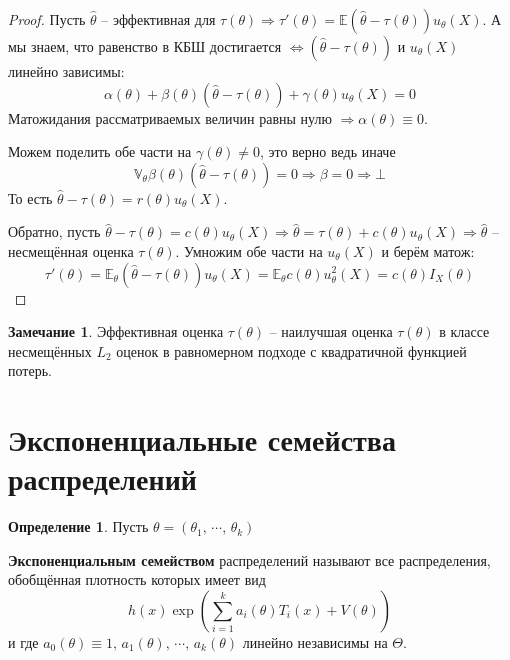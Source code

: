 \documentclass[a4paper,12pt]{article}
\theoremstyle{plain}
\theoremstyle{definition}
\newtheorem{definition}{Определение}[section]
\newtheorem*{note}{Замечание}
\theoremstyle{remark}
\begin{document}
\begin{proof}
  Пусть $\hat{\theta}$ -- эффективная для $\tau(\theta) \Rightarrow \tau'(\theta) = \mathbb{E}(\hat{\theta} - \tau(\theta))u_\theta(X)$. А мы знаем, что равенство в КБШ достигается $\Leftrightarrow (\hat{\theta} - \tau(\theta))$ и $u_\theta(X)$ линейно зависимы:
  \[
    \alpha(\theta) + \beta(\theta)(\hat{\theta} - \tau(\theta)) + \gamma(\theta)u_\theta(X) = 0
  \]
  Матожидания рассматриваемых величин равны нулю $\Rightarrow \alpha(\theta) \equiv 0$.

  Можем поделить обе части на $\gamma(\theta) \neq 0$, это верно ведь иначе
  \[
    \mathbb{V}_\theta\beta(\theta)(\hat{\theta} - \tau(\theta)) = 0 \Rightarrow \beta = 0 \Rightarrow\bot
  \]
  То есть $\hat{\theta} - \tau(\theta) = r(\theta)u_\theta(X)$.

  Обратно, пусть $\hat{\theta} - \tau(\theta) = c(\theta)u_\theta(X) \Rightarrow \hat{\theta} = \tau(\theta) + c(\theta)u_\theta(X) \Rightarrow \hat{\theta}$ -- несмещённая оценка $\tau(\theta)$. Умножим обе части на $u_\theta(X)$ и берём матож:
  \[
    \tau'(\theta) = \mathbb{E}_\theta(\hat{\theta} - \tau(\theta))u_\theta(X) = \mathbb{E}_\theta c(\theta)u^2_\theta(X) = c(\theta)I_X(\theta)
  \]
\end{proof}

\begin{note}
  Эффективная оценка $\tau(\theta)$ -- наилучшая оценка $\tau(\theta)$ в классе несмещённых $L_2$ оценок в равномерном подходе с квадратичной функцией потерь.
\end{note}

\section{Экспоненциальные семейства распределений}
\begin{definition}
  Пусть $\theta = (\theta_1,\,\cdots,\,\theta_k)$

  \textbf{Экспоненциальным семейством} распределений называют все распределения, обобщённая плотность которых имеет вид
  \[
    h(x)\exp\left(\sum_{i = 1}^ka_i(\theta)T_i(x) + V(\theta)\right)
  \]
  и где $a_0(\theta) \equiv 1,\, a_1(\theta),\,\cdots,\,a_k(\theta)$ линейно независимы на $\Theta$.
\end{definition}
\end{document}

